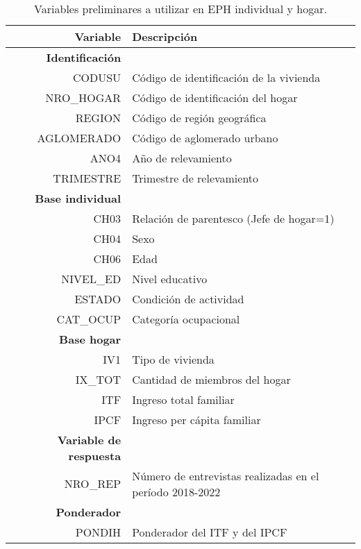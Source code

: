 \documentclass{article}
\begin{document}
\begin{table}
    \centering
\caption{Variables preliminares a utilizar en EPH individual y hogar.}

\

\label{tab:my_label}
    \begin{tabular}{|rl|} 
        \hline
        \textbf{Variable} & 
        \textbf{Descripción} \\ 
        \hline

        \textbf{Identificación}&\\
        CODUSU & Código de identificación de la vivienda\\
        NRO\_HOGAR & Código de identificación del hogar \\
        REGION&Código de región geográfica\\
        AGLOMERADO & Código de aglomerado urbano \\
        ANO4&Año de relevamiento\\
        TRIMESTRE&Trimestre de relevamiento\\
        
        \hline
        \textbf{Base individual}&\\
        CH03&Relación de parentesco (Jefe de hogar=1)\\
        CH04&Sexo\\
        CH06&Edad \\
        NIVEL\_ED&Nivel educativo\\
        ESTADO&Condición de actividad\\
        CAT\_OCUP&Categoría ocupacional\\
        
        \hline
        \textbf{Base hogar}&\\
        IV1&Tipo de vivienda\\
        IX\_TOT&Cantidad de miembros del hogar\\
        ITF&Ingreso total familiar\\
        IPCF&Ingreso per cápita familiar\\ 

        \hline
        \textbf{Variable de respuesta}&\\
        NRO\_REP&Número de entrevistas realizadas en el período 2018-2022\\ 
        
        \textbf{Ponderador}&\\
        PONDIH&Ponderador del ITF y del IPCF\\
        \hline
    \end{tabular}
    
    
\end{table}
\end{document}
